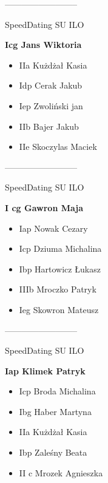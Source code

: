 \documentclass[a4paper,10pt]{article}
\begin{document}
\begin{multicols}{3}
\begin{minipage}[l]{\textwidth}
\begin{itemize}
    \end{itemize}



\end{minipage}



\begin{minipage}[l]{\textwidth}
--------------------------

  \footnotesize{SpeedDating SU ILO}

  \bfseries{Icg Jans Wiktoria}

  \begin{itemize}
    \item IIa Kużdżał Kasia
    \item Idp Cerak Jakub
    \item Iep Zwoliński jan
    \item IIb Bajer Jakub
    \item IIe Skoczylas Maciek

    \end{itemize}



\end{minipage}



\begin{minipage}[l]{\textwidth}
--------------------------

  \footnotesize{SpeedDating SU ILO}

  \bfseries{I cg Gawron Maja}

  \begin{itemize}
    \item Iap Nowak Cezary
    \item Icp Dziuma Michalina
    \item Ibp Hartowicz Łukasz
    \item IIIb Mroczko Patryk
    \item Ieg Skowron Mateusz

    \end{itemize}



\end{minipage}



\begin{minipage}[l]{\textwidth}
--------------------------

  \footnotesize{SpeedDating SU ILO}

  \bfseries{Iap Klimek Patryk}

  \begin{itemize}
    \item Icp Broda Michalina
    \item Ibg Haber Martyna
    \item IIa Kużdżał Kasia
    \item Ibp Zaleśny Beata
    \item II c Mrozek Agnieszka


\end{itemize}
\end{minipage}
\end{multicols}
\end{document}
